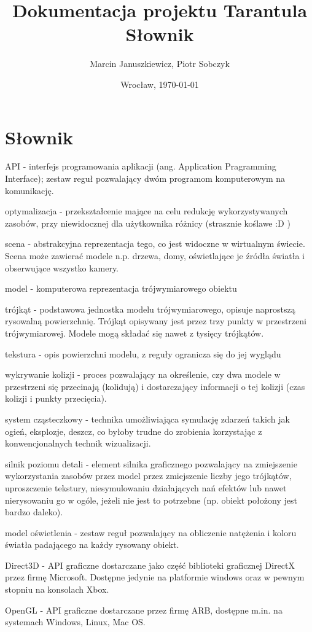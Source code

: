 \documentclass[11pt,leqno]{article}
\title{\LARGE Dokumentacja projektu \textbf{Tarantula}\\
							Słownik}
\author{Marcin Januszkiewicz, Piotr Sobczyk}
\date{Wrocław, \today}
\begin{document}
\maketitle 
\newpage
\tableofcontents
\newpage
\pagestyle{headings}

\section{Słownik}

API - interfejs programowania aplikacji (ang. Application Pragramming Interface); zestaw reguł pozwalający dwóm programom komputerowym na komunikację.

optymalizacja - przekształcenie mające na celu redukcję wykorzystywanych zasobów, przy niewidocznej dla użytkownika różnicy (strasznie koślawe :D )

scena - abstrakcyjna reprezentacja tego, co jest widoczne w wirtualnym świecie. Scena może zawierać modele n.p. drzewa, domy, oświetlające je źródła światła i obserwujące wszystko kamery.

model - komputerowa reprezentacja trójwymiarowego obiektu

trójkąt - podstawowa jednostka modelu trójwymiarowego, opisuje naprostszą rysowalną powierzchnię. Trójkąt opisywany jest przez trzy punkty w przestrzeni trójwymiarowej. Modele mogą składać się nawet z tysięcy trójkątów.

tekstura - opis powierzchni modelu, z reguły ogranicza się do jej wyglądu

wykrywanie kolizji - proces pozwalający na określenie, czy dwa modele w przestrzeni się przecinają (kolidują) i dostarczający informacji o tej kolizji (czas kolizji i punkty przecięcia).

system cząsteczkowy - technika umożliwiająca symulację zdarzeń takich jak ogień, eksplozje, deszcz, co byłoby trudne do zrobienia korzystając z konwencjonalnych technik wizualizacji.

silnik poziomu detali - element silnika graficznego pozwalający na zmiejszenie wykorzystania zasobów przez model przez zmiejszenie liczby jego trójkątów, uproszczenie tekstury, niesymulowaniu działających nań efektów lub nawet nierysowaniu go w ogóle, jeżeli nie jest to potrzebne (np. obiekt położony jest bardzo daleko).

model oświetlenia - zestaw reguł pozwalający na obliczenie natężenia i koloru światła padającego na każdy rysowany obiekt.

Direct3D - API graficzne dostarczane jako część biblioteki graficznej DirectX przez firmę Microsoft. Dostępne jedynie na platformie windows oraz w pewnym stopniu na konsolach Xbox.

OpenGL - API graficzne dostarczane przez firmę ARB, dostępne m.in. na systemach Windows, Linux, Mac OS.
\end{document}
